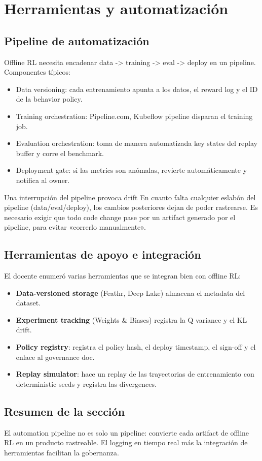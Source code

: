 \section{Herramientas y automatización}

\subsection{Pipeline de automatización}

Offline RL necesita encadenar data -> training -> eval -> deploy en un pipeline. Componentes típicos:

\begin{itemize}
    \item Data versioning: cada entrenamiento apunta a los datos, el reward log y el ID de la behavior policy.
    \item Training orchestration: Pipeline.com, Kubeflow pipeline disparan el training job.
    \item Evaluation orchestration: toma de manera automatizada key states del replay buffer y corre el benchmark.
    \item Deployment gate: si las metrics son anómalas, revierte automáticamente y notifica al owner.
\end{itemize}

\begin{warningbox}{Una interrupción del pipeline provoca drift}
En cuanto falta cualquier eslabón del pipeline (data/eval/deploy), los cambios posteriores dejan de poder rastrearse. Es necesario exigir que todo code change pase por un artifact generado por el pipeline, para evitar «correrlo manualmente».
\end{warningbox}

\subsection{Herramientas de apoyo e integración}

El docente enumeró varias herramientas que se integran bien con offline RL:

\begin{itemize}
    \item \textbf{Data-versioned storage} (Feathr, Deep Lake) almacena el metadata del dataset.
    \item \textbf{Experiment tracking} (Weights \& Biases) registra la Q variance y el KL drift.
    \item \textbf{Policy registry}: registra el policy hash, el deploy timestamp, el sign-off y el enlace al governance doc.
    \item \textbf{Replay simulator}: hace un replay de las trayectorias de entrenamiento con deterministic seeds y registra las divergences.
\end{itemize}

\subsection{Resumen de la sección}

El automation pipeline no es solo un pipeline: convierte cada artifact de offline RL en un producto rastreable. El logging en tiempo real más la integración de herramientas facilitan la gobernanza.
